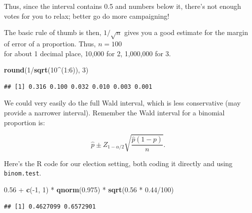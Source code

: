 \documentclass[]{article}
\newenvironment{Shaded}{\begin{snugshade}}{\end{snugshade}}
\newcommand{\KeywordTok}[1]{\textcolor[rgb]{0.13,0.29,0.53}{\textbf{{#1}}}}
\newcommand{\DecValTok}[1]{\textcolor[rgb]{0.00,0.00,0.81}{{#1}}}
\newcommand{\FloatTok}[1]{\textcolor[rgb]{0.00,0.00,0.81}{{#1}}}
\newcommand{\StringTok}[1]{\textcolor[rgb]{0.31,0.60,0.02}{{#1}}}
\newcommand{\NormalTok}[1]{{#1}}
\begin{document}
Thus, since the interval contains 0.5 and numbers below it, there's not
enough votes for you to relax; better go do more campaigning!

The basic rule of thumb is then, $1/\sqrt{n}$ gives you a good estimate
for the margin of error of a proportion. Thus, $n=100$\\for about 1
decimal place, 10,000 for 2, 1,000,000 for 3.

\begin{Shaded}
\begin{Highlighting}[]
\KeywordTok{round}\NormalTok{(}\DecValTok{1}\NormalTok{/}\KeywordTok{sqrt}\NormalTok{(}\DecValTok{10}\NormalTok{^(}\DecValTok{1}\NormalTok{:}\DecValTok{6}\NormalTok{)), }\DecValTok{3}\NormalTok{)}
\end{Highlighting}
\end{Shaded}

\begin{verbatim}
## [1] 0.316 0.100 0.032 0.010 0.003 0.001
\end{verbatim}

We could very easily do the full Wald interval, which is less
conservative (may provide a narrower interval). Remember the Wald
interval for a binomial proportion is:

\[
\hat p \pm Z_{1-\alpha/2} \sqrt{\frac{\hat p (1 - \hat p)}{n}}.
\]

Here's the R code for our election setting, both coding it directly and
using \texttt{binom.test}.

\begin{Shaded}
\begin{Highlighting}[]
\FloatTok{0.56} \NormalTok{+}\StringTok{ }\KeywordTok{c}\NormalTok{(-}\DecValTok{1}\NormalTok{, }\DecValTok{1}\NormalTok{) *}\StringTok{ }\KeywordTok{qnorm}\NormalTok{(}\FloatTok{0.975}\NormalTok{) *}\StringTok{ }\KeywordTok{sqrt}\NormalTok{(}\FloatTok{0.56} \NormalTok{*}\StringTok{ }\FloatTok{0.44}\NormalTok{/}\DecValTok{100}\NormalTok{)}
\end{Highlighting}
\end{Shaded}

\begin{verbatim}
## [1] 0.4627099 0.6572901
\end{verbatim}

\begin{Shaded}
\end{Shaded}
\end{document}
